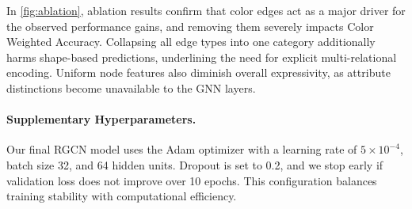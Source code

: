 \documentclass{article} %
\theoremstyle{plain}
\theoremstyle{definition}
\theoremstyle{remark}
\begin{document}
In \cref{fig:ablation}, ablation results confirm that color edges act as a major driver for the observed performance gains, and removing them severely impacts Color Weighted Accuracy. Collapsing all edge types into one category additionally harms shape-based predictions, underlining the need for explicit multi-relational encoding. Uniform node features also diminish overall expressivity, as attribute distinctions become unavailable to the GNN layers. 

\paragraph{Supplementary Hyperparameters.}
Our final RGCN model uses the Adam optimizer with a learning rate of $5\times10^{-4}$, batch size 32, and 64 hidden units. Dropout is set to 0.2, and we stop early if validation loss does not improve over 10 epochs. This configuration balances training stability with computational efficiency.
\end{document}
